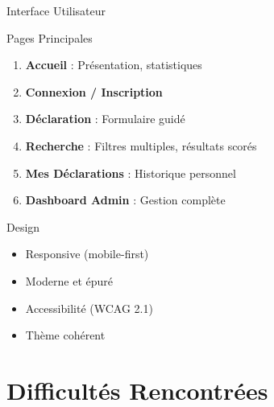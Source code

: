 \documentclass[aspectratio=169]{beamer}
\begin{document}
\begin{frame}{Interface Utilisateur}
    \begin{block}{Pages Principales}
        \begin{enumerate}
            \item \textbf{Accueil} : Présentation, statistiques
            \item \textbf{Connexion / Inscription}
            \item \textbf{Déclaration} : Formulaire guidé
            \item \textbf{Recherche} : Filtres multiples, résultats scorés
            \item \textbf{Mes Déclarations} : Historique personnel
            \item \textbf{Dashboard Admin} : Gestion complète
        \end{enumerate}
    \end{block}

    \vspace{0.3cm}

    \begin{exampleblock}{Design}
        \begin{itemize}
            \item Responsive (mobile-first)
            \item Moderne et épuré
            \item Accessibilité (WCAG 2.1)
            \item Thème cohérent
        \end{itemize}
    \end{exampleblock}
\end{frame}

\section{Difficultés Rencontrées}
\end{document}
